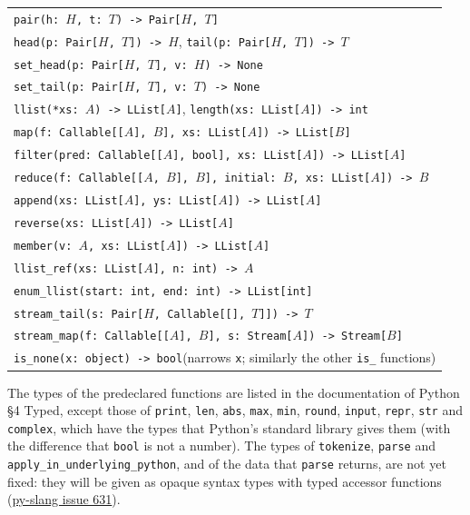 \begin{center}
  \begin{tabular}{l}
    \texttt{pair(h:~$H$, t:~$T$) -> Pair[$H$, $T$]} \\
    \texttt{head(p:~Pair[$H$, $T$]) -> $H$},\quad
    \texttt{tail(p:~Pair[$H$, $T$]) -> $T$} \\
    \texttt{set\_head(p:~Pair[$H$, $T$], v:~$H$) -> None} \\
    \texttt{set\_tail(p:~Pair[$H$, $T$], v:~$T$) -> None} \\
    \texttt{llist(*xs:~$A$) -> LList[$A$]},\quad
    \texttt{length(xs:~LList[$A$]) -> int} \\
    \texttt{map(f:~Callable[[$A$], $B$], xs:~LList[$A$]) -> LList[$B$]} \\
    \texttt{filter(pred:~Callable[[$A$], bool], xs:~LList[$A$]) -> LList[$A$]} \\
    \texttt{reduce(f:~Callable[[$A$, $B$], $B$], initial:~$B$, xs:~LList[$A$]) -> $B$} \\
    \texttt{append(xs:~LList[$A$], ys:~LList[$A$]) -> LList[$A$]} \\
    \texttt{reverse(xs:~LList[$A$]) -> LList[$A$]} \\
    \texttt{member(v:~$A$, xs:~LList[$A$]) -> LList[$A$]} \\
    \texttt{llist\_ref(xs:~LList[$A$], n:~int) -> $A$} \\
    \texttt{enum\_llist(start:~int, end:~int) -> LList[int]} \\
    \texttt{stream\_tail(s:~Pair[$H$, Callable[[], $T$]]) -> $T$} \\
    \texttt{stream\_map(f:~Callable[[$A$], $B$], s:~Stream[$A$]) -> Stream[$B$]} \\
    \texttt{is\_none(x:~object) -> bool}\quad (narrows \texttt{x}; similarly the other
    \texttt{is\_} functions) \\
  \end{tabular}
\end{center}

The types of the predeclared functions are listed in the documentation of Python \S 4 Typed, except
those of \texttt{print}, \texttt{len}, \texttt{abs}, \texttt{max}, \texttt{min}, \texttt{round},
\texttt{input}, \texttt{repr}, \texttt{str} and \texttt{complex}, which have the types that Python's
standard library gives them (with the difference that \texttt{bool} is not a number).
The types of \texttt{tokenize}, \texttt{parse} and \texttt{apply\_in\_underlying\_python}, and
of the data that \texttt{parse} returns, are not yet fixed: they will be given as opaque
syntax types with typed accessor functions
(\href{https://github.com/source-academy/py-slang/issues/631}{\color{DarkBlue}py-slang issue 631}).

